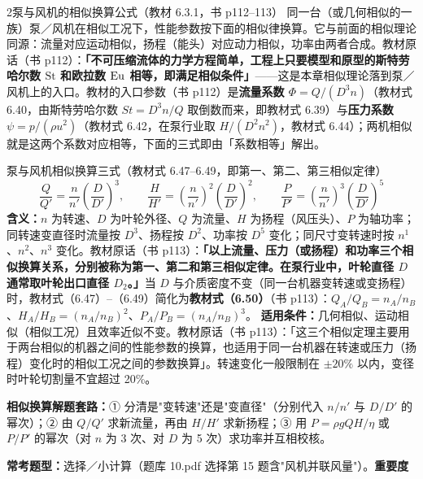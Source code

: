 \begin{kaodian}{2}{泵与风机的相似换算公式（教材 6.3.1，书 p112--113）}
同一台（或几何相似的一族）泵／风机在相似工况下，性能参数按下面的相似律换算。它与前面的相似理论同源：流量对应运动相似，扬程（能头）对应动力相似，功率由两者合成。教材原话（书 p112）：\textbf{「不可压缩流体的力学方程简单，工程上只要模型和原型的斯特劳哈尔数 $\mathrm{St}$ 和欧拉数 $\mathrm{Eu}$ 相等，即满足相似条件」}——这是本章相似理论落到泵／风机上的入口。教材的入口参数（书 p112）是\textbf{流量系数 $\Phi=Q/(D^{3}n)$}（教材式 6.40，由斯特劳哈尔数 $St=D^{3}n/Q$ 取倒数而来，即教材式 6.39）与\textbf{压力系数 $\psi=p/(\rho u^{2})$}（教材式 6.42，在泵行业取 $H/(D^{2}n^{2})$，教材式 6.44）；两机相似就是这两个系数对应相等，下面的三式即由「系数相等」解出。

\begin{gongshi}{泵与风机相似换算三式（教材式 6.47--6.49，即第一、第二、第三相似定律）}
\[ \frac{Q}{Q'}=\frac{n}{n'}\left(\frac{D}{D'}\right)^{3},\qquad
   \frac{H}{H'}=\left(\frac{n}{n'}\right)^{2}\left(\frac{D}{D'}\right)^{2},\qquad
   \frac{P}{P'}=\left(\frac{n}{n'}\right)^{3}\left(\frac{D}{D'}\right)^{5} \]
\textbf{含义：}$n$ 为转速、$D$ 为叶轮外径、$Q$ 为流量、$H$ 为扬程（风压头）、$P$ 为轴功率；同转速变直径时流量按 $D^{3}$、扬程按 $D^{2}$、功率按 $D^{5}$ 变化；同尺寸变转速时按 $n^{1}$、$n^{2}$、$n^{3}$ 变化。教材原话（书 p113）：\textbf{「以上流量、压力（或扬程）和功率三个相似换算关系，分别被称为第一、第二和第三相似定律。在泵行业中，叶轮直径 $D$ 通常取叶轮出口直径 $D_2$。」}当 $D$ 与介质密度不变（同一台机器变转速或变扬程）时，教材式（6.47）--（6.49）简化为\textbf{教材式（6.50）}（书 p113）：$Q_A/Q_B=n_A/n_B$、$H_A/H_B=(n_A/n_B)^{2}$、$P_A/P_B=(n_A/n_B)^{3}$。
\textbf{适用条件：}几何相似、运动相似（相似工况）且效率近似不变。教材原话（书 p113）：「这三个相似定理主要用于两台相似的机器之间的性能参数的换算，也适用于同一台机器在转速或压力（扬程）变化时的相似工况之间的参数换算」。转速变化一般限制在 $\pm 20\%$ 以内，变径时叶轮切割量不宜超过 20\%。
\end{gongshi}

\begin{banfa}
\textbf{相似换算解题套路：}① 分清是"变转速"还是"变直径"（分别代入 $n/n'$ 与 $D/D'$ 的幂次）；② 由 $Q/Q'$ 求新流量，再由 $H/H'$ 求新扬程；③ 用 $P=\rho gQH/\eta$ 或 $P/P'$ 的幂次（对 $n$ 为 3 次、对 $D$ 为 5 次）求功率并互相校核。
\end{banfa}

\textbf{常考题型：}选择／小计算（题库 10.pdf 选择第 15 题含"风机并联风量"）。\quad\textbf{重要度 }\quad{}\quad{}
\end{kaodian}

